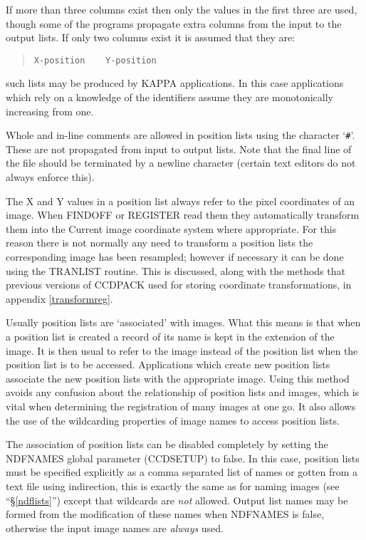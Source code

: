 \documentclass[twoside,11pt]{article}
\newcommand{\hyperref}[4]{#2\ref{#4}#3}
\newcommand{\htmlref}[2]{#1}
\newcommand{\latexhtml}[2]{#1}
\newcommand{\xref}[3]{#1}
\renewcommand{\_}{\texttt{\symbol{95}}}
\newcommand{\ttsize}{\latexhtml{\small}{}}
\newenvironment{myquote}{\begin{quote}\ttsize}{\end{quote}}
\newcommand{\routine}[1]{{\sc #1}}
\newcommand{\xroutine}[1]{\htmlref{{\sc #1}}{#1}}
\begin{document}
If more than three columns exist then only the values in the first 
three are used, though some of the programs propagate extra columns
from the input to the output lists.
If only two columns exist it is assumed that they are:
\begin{myquote}
\begin{verbatim}
X-position    Y-position
\end{verbatim}
\end{myquote}
such lists may be produced by \xref{KAPPA}{sun95}{} applications. In
this case applications which rely on a knowledge of the identifiers
assume they are monotonically increasing from one.

Whole and in-line comments are allowed in position lists using the
character `{\tt \#}'.  These are not propagated from input to output lists.
Note that the final line of the file should be terminated by a 
newline character (certain text editors do not always enforce this).

The X and Y values in a position list always refer to the 
pixel coordinates of an image.
When \routine{FINDOFF} or \routine{REGISTER} read them they
automatically transform them into the Current image coordinate system
where appropriate.
For this reason there is not normally any need to transform a position
lists the corresponding image has been resampled; 
however if necessary it can be done using the
\xroutine{TRANLIST} routine.  This is discussed, along with the
methods that previous versions of CCDPACK used 
for storing coordinate transformations,
in appendix \ref{transformreg}.

Usually position lists are `associated' with images. What this means is
that when a position list is created a record of its name is kept in the
extension of the image. It is then usual to refer to the image instead of
the position list when the position list is to be accessed. Applications
which create new position lists associate the new position lists with
the appropriate image. Using this method avoids any confusion about the
relationship of position lists and images, which is vital when determining
the registration of many images at one go. It also allows the use of the
wildcarding properties of image names to access position lists.

The association of position lists can be disabled completely by setting
the NDFNAMES global parameter
(\xroutine{CCDSETUP}) to false. In this case, position lists must be specified
explicitly as a comma separated list of names or gotten from a text
file using indirection, this is exactly the same as for naming images
(see ``\hyperref{processing lists of data}{\S}{}{ndflists}'') except that
wildcards are {\em not} allowed. Output list names may be formed
from the modification of these names when NDFNAMES is false, otherwise
the input image names are {\em always} used.
\end{document}

